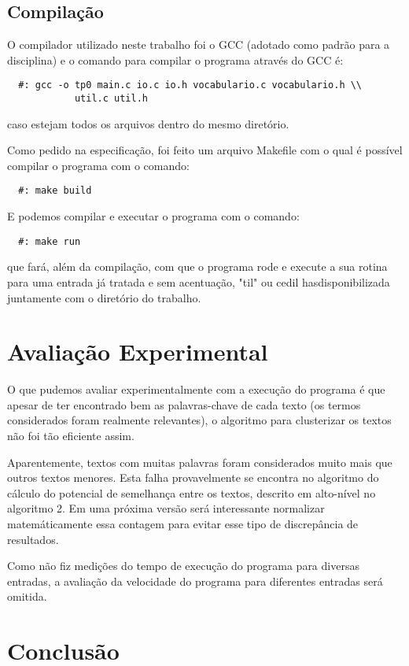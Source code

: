 \documentclass[12pt]{article}
\begin{document}
\subsection{Compilação}
O compilador utilizado neste trabalho foi o GCC (adotado como padrão para a disciplina) e 
o comando para compilar o programa através do GCC é:
\begin{verbatim}
  #: gcc -o tp0 main.c io.c io.h vocabulario.c vocabulario.h \\
            util.c util.h
\end{verbatim}
caso estejam todos os arquivos dentro do mesmo diretório.

Como pedido na especificação, foi feito um arquivo Makefile com o qual é possível compilar
o programa com o comando: 
\begin{verbatim}
  #: make build
\end{verbatim}

E podemos compilar e executar o programa com o comando:
\begin{verbatim}
  #: make run
\end{verbatim}
que fará, além da compilação, com que o programa rode e execute a sua rotina para uma entrada
já tratada e sem acentuação, "til" ou cedil hasdisponibilizada juntamente com o diretório 
do trabalho.

\section{Avaliação Experimental}
\label{avaliacao_experimental}

O que pudemos avaliar experimentalmente com a execução do programa é que apesar de ter 
encontrado bem as palavras-chave de cada texto (os termos considerados foram realmente 
relevantes), o algoritmo para clusterizar os textos não foi tão eficiente assim.

Aparentemente, textos com muitas palavras foram considerados muito mais que outros textos 
menores. Esta falha provavelmente se encontra no algoritmo do cálculo do potencial de 
semelhança entre os textos, descrito em alto-nível no algoritmo 2. Em uma próxima versão 
será interessante normalizar matemáticamente essa contagem para evitar esse tipo de 
discrepância de resultados.

Como não fiz medições do tempo de execução do programa para diversas entradas, a avaliação
da velocidade do programa para diferentes entradas será omitida.

\section{Conclusão}
\label{conclusao}
\end{document}
